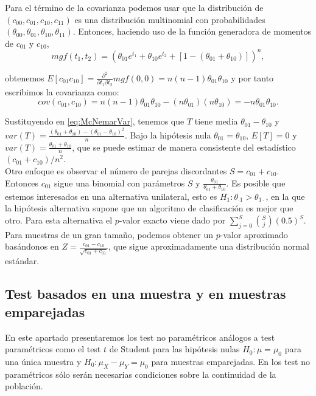 	Para el término de la covarianza podemos usar que la 
distribución de $(c_{00}, c_{01}, c_{10}, c_{11})$ es una 
distribución multinomial con probabilidades $(\theta_{00}, 
\theta_{01}, \theta_{10}, \theta_{11})$. Entonces, haciendo 
uso de la función generadora de momentos de $c_{01}$ y 
$c_{10}$,
	\[ 
		mgf(t_1, t_2) = 
		\left(
			\theta_{01} e^{t_1} + 
			\theta_{10} e^{t_2} + 
			[ 1 - (\theta_{01} + \theta_{10})] \right)^n,
	\]
	
	obtenemos $E[c_{01}c_{10}] = \frac{\partial^2 }
{\partial t_1 \partial t_2} mgf(0,0) = n(n-1)\theta_{01} 
\theta_{10}$ y por tanto escribimos la covarianza como:
	\[
		cov( c_{01}, c_{10} ) =
			n (n-1) \theta_{01} \theta_{10} -
			(n \theta_{01}) (n \theta_{10}) = 
			- n \theta_{01} \theta_{10}.
	\]
	
	Sustituyendo en \ref{eq:McNemarVar}, tenemos que $T$ 
tiene media $\theta_{01}-\theta_{10}$ y $var(T) = 
\frac{(\theta_{01} + \theta_{10}) - (\theta_{01} - 
\theta_{10})^2 }{n}$. Bajo la hipótesis nula $\theta_{01} = 
\theta_{10}$, $E[T] = 0$ y $var(T) = \frac{\theta_{01}+
\theta_{10}}{n}$, que se puede estimar de manera consistente 
del estadístico $(c_{01} + c_{10})/n^2$.\\
	Otro enfoque es observar el número de parejas 
discordantes $S = c_{01} + c_{10}$. Entonces $c_{01}$ sigue 
una binomial con parámetros $S$ y $\frac{\theta_{01}}
{\theta_{01}+\theta_{10}}$. Es posible que estemos 
interesados en una alternativa unilateral, esto es $H_1: 
\theta_{\cdot 1} > \theta_{1 \cdot}$, en la que la hipótesis 
alternativa supone que un algoritmo de clasificación es mejor 
que otro. Para esta alternativa el $p$-valor exacto viene 
dado por $\sum\limits_{j=0}^S {S \choose j}(0.5)^S$. Para 
muestras de un gran tamaño, podemos obtener un $p$-valor 
aproximado basándonos en $Z = \frac{c_{01} - c_{10}}
{\sqrt{c_{01} + c_{01}}}$, que sigue aproximadamente una 
distribución normal estándar.
	
\subsection{Test basados en una muestra y en muestras emparejadas}
	
	En este apartado presentaremos los test no paramétricos 
análogos a test paramétricos como el test $t$ de Student para 
las hipótesis nulas $H_0: \mu = \mu_0$ para una única muestra 
y $H_0: \mu_X - \mu_Y = \mu_0$ para muestras emparejadas. En 
los test no paramétricos sólo serán necesarias condiciones 
sobre la continuidad de la población. 
	
